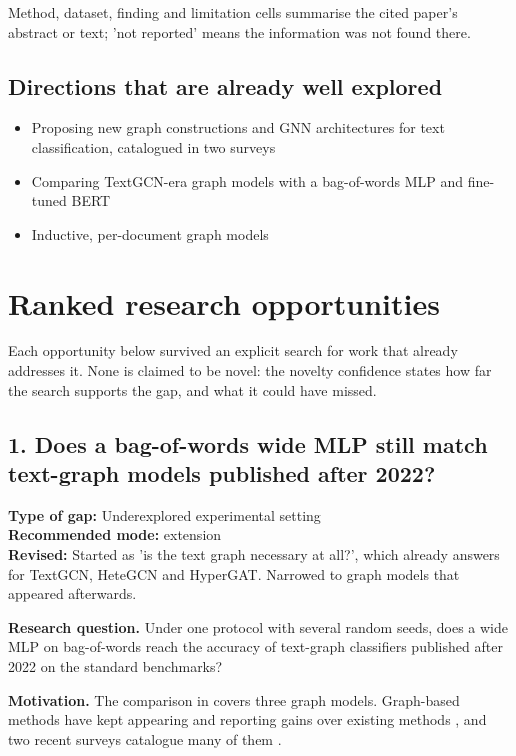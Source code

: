 \documentclass[11pt,a4paper]{article}
\begin{document}
Method, dataset, finding and limitation cells summarise the cited paper's abstract or text; 'not reported' means the information was not found there.

\subsection{Directions that are already well explored}

\begin{itemize}
\item [V] Proposing new graph constructions and GNN architectures for text classification, catalogued in two surveys \cite{wang2024,rizvi2025}
\item [V] Comparing TextGCN-era graph models with a bag-of-words MLP and fine-tuned BERT \cite{galke2022}
\item [V] Inductive, per-document graph models \cite{zhang2020}
\end{itemize}

\section{Ranked research opportunities}

Each opportunity below survived an explicit search for work that already addresses it. None is claimed to be novel: the novelty confidence states how far the search supports the gap, and what it could have missed.

\subsection{1. Does a bag-of-words wide MLP still match text-graph models published after 2022?}
\textbf{Type of gap:} Underexplored experimental setting\\
\textbf{Recommended mode:} extension\\
\textbf{Revised:} Started as 'is the text graph necessary at all?', which \cite{galke2022} already answers for TextGCN, HeteGCN and HyperGAT. Narrowed to graph models that appeared afterwards.

\textbf{Research question.} Under one protocol with several random seeds, does a wide MLP on bag-of-words reach the accuracy of text-graph classifiers published after 2022 on the standard benchmarks?

\textbf{Motivation.} The comparison in \cite{galke2022} covers three graph models. Graph-based methods have kept appearing and reporting gains over existing methods \cite{donabauer2025}, and two recent surveys catalogue many of them \cite{wang2024,rizvi2025}.
\end{document}
